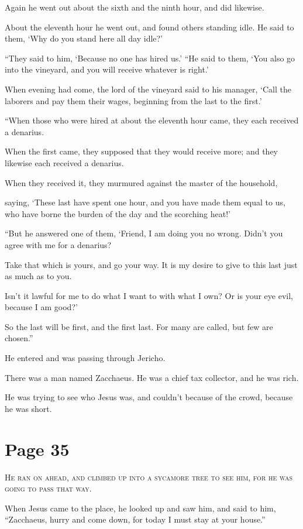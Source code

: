 Again he went out about the sixth and the ninth hour, and did likewise.

About the eleventh hour he went out, and found others standing idle. He said to them, ‘Why do you stand here all day idle?’

“They said to him, ‘Because no one has hired us.’ “He said to them, ‘You also go into the vineyard, and you will receive whatever is right.’

When evening had come, the lord of the vineyard said to his manager, ‘Call the laborers and pay them their wages, beginning from the last to the first.’

“When those who were hired at about the eleventh hour came, they each received a denarius.

When the first came, they supposed that they would receive more; and they likewise each received a denarius.

When they received it, they murmured against the master of the household,

saying, ‘These last have spent one hour, and you have made them equal to us, who have borne the burden of the day and the scorching heat!’

“But he answered one of them, ‘Friend, I am doing you no wrong. Didn’t you agree with me for a denarius?

Take that which is yours, and go your way. It is my desire to give to this last just as much as to you.

Isn’t it lawful for me to do what I want to with what I own? Or is your eye evil, because I am good?’

So the last will be first, and the first last. For many are called, but few are chosen.”

He entered and was passing through Jericho.

There was a man named Zacchaeus. He was a chief tax collector, and he was rich.

He was trying to see who Jesus was, and couldn’t because of the crowd, because he was short.



\chapterornament
\section*{Page 35}

\lettrine{H}{e ran on ahead, and climbed up into a sycamore tree to see him, for he was going to pass that way.}

When Jesus came to the place, he looked up and saw him, and said to him, “Zacchaeus, hurry and come down, for today I must stay at your house.”

